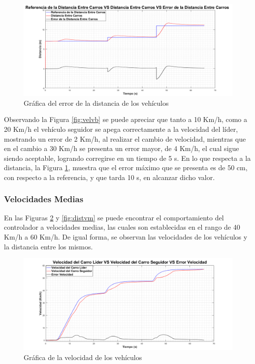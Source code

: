 \begin{figure}[H]
	\centering
		\includegraphics[scale=0.35]{Imagenes/accvmdist}
		\caption{Gráfica del error de la distancia de los vehículos}
		\label{fig:distvb}
\end{figure}	

\par Observando la Figura \ref{fig:velvb} se puede apreciar que tanto a 10 Km/h, como a 20 Km/h el vehículo seguidor se apega correctamente a la velocidad del líder, mostrando un error de 2 Km/h, al realizar el cambio de velocidad, mientras que en el cambio a 30 Km/h se presenta un error mayor, de 4 Km/h, el cual sigue siendo aceptable, logrando corregirse en un tiempo de 5 s. En lo que respecta a la distancia, la Figura \ref{fig:distvb}, muestra que el error máximo que se presenta es de 50 cm, con respecto a la referencia, y que tarda 10 s, en alcanzar dicho valor.

\subsubsection{Velocidades Medias}

En las Figuras \ref{fig:velvm} y \ref{fig:distvm} se puede encontrar el comportamiento del controlador a velocidades medias, las cuales son establecidas en el rango de 40 Km/h a 60 Km/h. De igual forma, se observan las velocidades de los vehículos y la distancia entre los mismos.

\begin{figure}[H]
	\centering
		\includegraphics[scale=0.35]{Imagenes/accvm}
		\caption{Gráfica de la velocidad de los vehículos}
		\label{fig:velvm}
\end{figure}	


